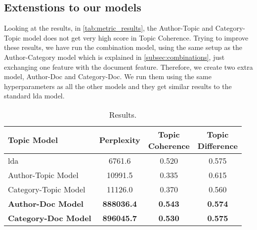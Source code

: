 \subsection{Extenstions to our models}\label{subsec:app_exten_models}
Looking at the results, in \autoref{tab:metric_results}, the Author-Topic and Category-Topic model does not get very high score in Topic Coherence.
Trying to improve these results, we have run the combination model, using the same setup as the Author-Category model which is explained in \autoref{subsec:combinations}, just exchanging one feature with the document feature.
Therefore, we create two extra model, Author-Doc and Category-Doc.
We run them using the same hyperparameters as all the other models and they get similar results to the standard \gls{lda} model.

\begin{table}[h]
	\centering
	\caption{Results.}
	\begin{tabular}{l|c|c|c}
		Topic Model & Perplexity & \makecell{Topic \\ Coherence} & \makecell{Topic \\ Difference} \\
		\midrule
		\Acrlong{lda} & 6761.6 & 0.520 & 0.575 \\
		Author-Topic Model & 10991.5 & 0.335 & 0.615 \\
		Category-Topic Model & 11126.0 & 0.370 & 0.560 \\
		\textbf{Author-Doc Model} & \textbf{888036.4} & \textbf{0.543} & \textbf{0.574} \\
		\textbf{Category-Doc Model} & \textbf{896045.7} &\textbf{ 0.530} & \textbf{0.575} \\
	\end{tabular}
	\label{tab:_extra_metric_results}
\end{table}

